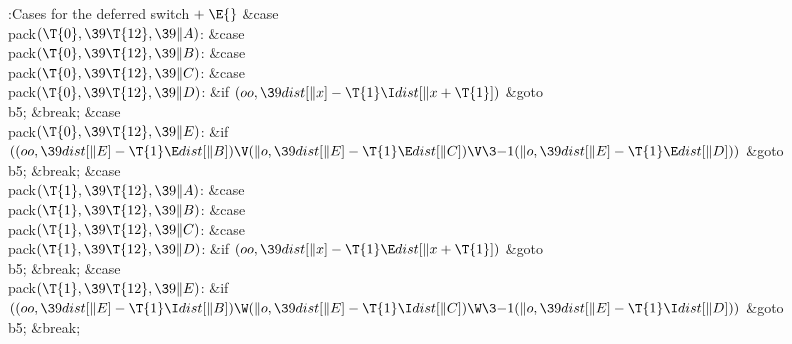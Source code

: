 \B{}:Cases for the deferred switch\X${}\mathrel+\E{}$\6
\4\&{case} \\{pack}${}(\T{0},\39\T{12},\39\|A){}$:\5
\&{case} \\{pack}${}(\T{0},\39\T{12},\39\|B){}$:\5
\&{case} \\{pack}${}(\T{0},\39\T{12},\39\|C){}$:\5
\&{case} \\{pack}${}(\T{0},\39\T{12},\39\|D){}$:\6
\&{if} ${}(\\{oo},\39\\{dist}[\|x]-\T{1}\I\\{dist}[\|x+\T{1}]){}$\1\5
\&{goto} \\{b5};\5
\2\&{break};\6
\4\&{case} \\{pack}${}(\T{0},\39\T{12},\39\|E){}$:\5
\&{if} ${}((\\{oo},\39\\{dist}[\|E]-\T{1}\E\\{dist}[\|B])\V(\|o,\39\\{dist}[%
\|E]-\T{1}\E\\{dist}[\|C])\V\3{-1}(\|o,\39\\{dist}[\|E]-\T{1}\E\\{dist}[%
\|D])){}$\1\5
\&{goto} \\{b5};\5
\2\&{break};\6
\4\&{case} \\{pack}${}(\T{1},\39\T{12},\39\|A){}$:\5
\&{case} \\{pack}${}(\T{1},\39\T{12},\39\|B){}$:\5
\&{case} \\{pack}${}(\T{1},\39\T{12},\39\|C){}$:\5
\&{case} \\{pack}${}(\T{1},\39\T{12},\39\|D){}$:\6
\&{if} ${}(\\{oo},\39\\{dist}[\|x]-\T{1}\E\\{dist}[\|x+\T{1}]){}$\1\5
\&{goto} \\{b5};\5
\2\&{break};\6
\4\&{case} \\{pack}${}(\T{1},\39\T{12},\39\|E){}$:\5
\&{if} ${}((\\{oo},\39\\{dist}[\|E]-\T{1}\I\\{dist}[\|B])\W(\|o,\39\\{dist}[%
\|E]-\T{1}\I\\{dist}[\|C])\W\3{-1}(\|o,\39\\{dist}[\|E]-\T{1}\I\\{dist}[%
\|D])){}$\1\5
\&{goto} \\{b5};\5
\2\&{break};\par
\fi

